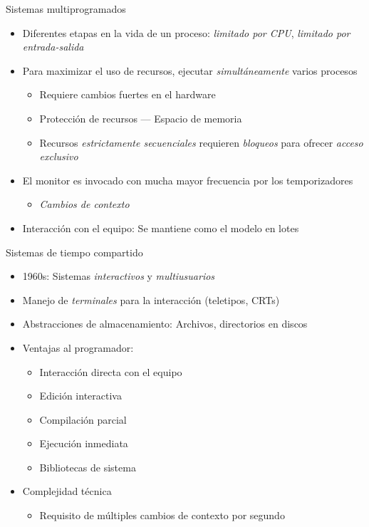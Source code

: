 \documentclass[presentation]{beamer}
\begin{document}
\begin{frame}[label={sec:org8ae1374}]{Sistemas multiprogramados}
\begin{itemize}
\item Diferentes etapas en la vida de un proceso: \emph{limitado por CPU},
\emph{limitado por entrada-salida}
\item Para maximizar el uso de recursos, ejecutar \emph{simultáneamente} varios
procesos
\begin{itemize}
\item Requiere cambios fuertes en el hardware
\item Protección de recursos — Espacio de memoria
\item Recursos \emph{estrictamente secuenciales} requieren \emph{bloqueos} para
ofrecer \emph{acceso exclusivo}
\end{itemize}
\item El monitor es invocado con mucha mayor frecuencia por los
temporizadores
\begin{itemize}
\item \emph{Cambios de contexto}
\end{itemize}
\item Interacción con el equipo: Se mantiene como el modelo en lotes
\end{itemize}
\end{frame}

\begin{frame}[label={sec:org0cfb4d1}]{Sistemas de tiempo compartido}
\begin{itemize}
\item 1960s: Sistemas \emph{interactivos} y \emph{multiusuarios}
\item Manejo de \emph{terminales} para la interacción (teletipos, CRTs)
\item Abstracciones de almacenamiento: Archivos, directorios en discos
\item Ventajas al programador:
\begin{itemize}
\item Interacción directa con el equipo
\item Edición interactiva
\item Compilación parcial
\item Ejecución inmediata
\item Bibliotecas de sistema
\end{itemize}
\item Complejidad técnica
\begin{itemize}
\item Requisito de múltiples cambios de contexto por segundo
\end{itemize}
\end{itemize}
\end{frame}
\end{document}
